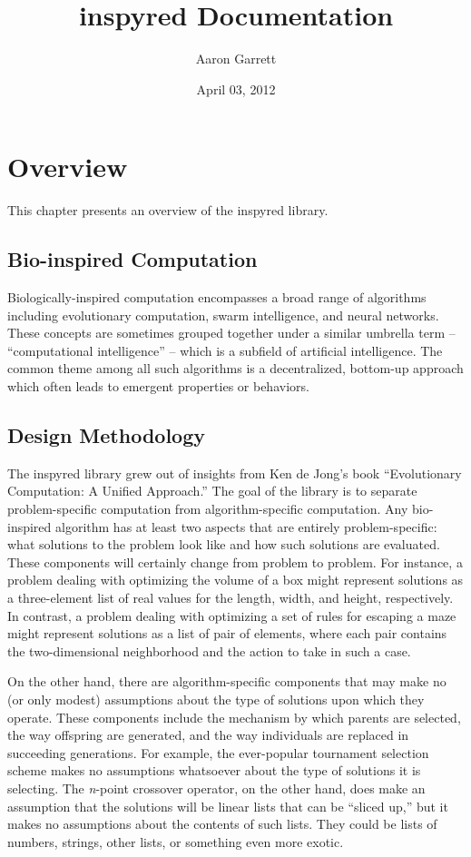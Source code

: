 \documentclass[letterpaper,10pt,english]{sphinxmanual}
\title{inspyred Documentation}
\date{April 03, 2012}
\author{Aaron Garrett}
\begin{document}
\maketitle
\tableofcontents
{}\label{index::doc}



\chapter{Overview}
\label{overview:inspyred-bio-inspired-algorithms-in-python}\label{overview:overview}\label{overview::doc}
This chapter presents an overview of the inspyred library.


\section{Bio-inspired Computation}
\label{overview:bio-inspired-computation}
Biologically-inspired computation encompasses a broad range of algorithms including evolutionary computation, swarm intelligence, and neural networks. These concepts are sometimes grouped together under a similar umbrella term -- ``computational intelligence'' -- which is a subfield of artificial intelligence. The common theme among all such algorithms is a decentralized, bottom-up approach which often leads to emergent properties or behaviors.


\section{Design Methodology}
\label{overview:design-methodology}
The inspyred library grew out of insights from Ken de Jong's book ``Evolutionary Computation: A Unified Approach.'' The goal of the library is to separate problem-specific computation from algorithm-specific computation. Any bio-inspired algorithm has at least two aspects that are entirely problem-specific: what solutions to the problem look like and how such solutions are evaluated. These components will certainly change from problem to problem. For instance, a problem dealing with optimizing the volume of a box might represent solutions as a three-element list of real values for the length, width, and height, respectively. In contrast, a problem dealing with optimizing a set of rules for escaping a maze might represent solutions as a list of pair of elements, where each pair contains the two-dimensional neighborhood and the action to take in such a case.

On the other hand, there are algorithm-specific components that may make no (or only modest) assumptions about the type of solutions upon which they operate. These components include the mechanism by which parents are selected, the way offspring are generated, and the way individuals are replaced in succeeding generations. For example, the ever-popular tournament selection scheme makes no assumptions whatsoever about the type of solutions it is selecting. The \emph{n}-point crossover operator, on the other hand, does make an assumption that the solutions will be linear lists that can be ``sliced up,'' but it makes no assumptions about the contents of such lists. They could be lists of numbers, strings, other lists, or something even more exotic.
\end{document}
